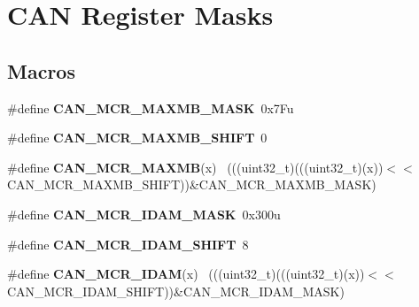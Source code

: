 \hypertarget{group___c_a_n___register___masks}{}\section{C\+A\+N Register Masks}
\label{group___c_a_n___register___masks}
\subsection*{Macros}
\begin{DoxyCompactItemize}
\item 
\hypertarget{group___c_a_n___register___masks_ga86b59c74c0b9f310c3922c7c8c04dd03}{}\#define {\bfseries C\+A\+N\+\_\+\+M\+C\+R\+\_\+\+M\+A\+X\+M\+B\+\_\+\+M\+A\+S\+K}~0x7\+Fu\label{group___c_a_n___register___masks_ga86b59c74c0b9f310c3922c7c8c04dd03}

\item 
\hypertarget{group___c_a_n___register___masks_ga0807275385d5041baeca3bb7ddb4bdf5}{}\#define {\bfseries C\+A\+N\+\_\+\+M\+C\+R\+\_\+\+M\+A\+X\+M\+B\+\_\+\+S\+H\+I\+F\+T}~0\label{group___c_a_n___register___masks_ga0807275385d5041baeca3bb7ddb4bdf5}

\item 
\hypertarget{group___c_a_n___register___masks_ga7d840ec6bea7287110c94cda3613bb7d}{}\#define {\bfseries C\+A\+N\+\_\+\+M\+C\+R\+\_\+\+M\+A\+X\+M\+B}(x)                                              ~(((uint32\+\_\+t)(((uint32\+\_\+t)(x))$<$$<$C\+A\+N\+\_\+\+M\+C\+R\+\_\+\+M\+A\+X\+M\+B\+\_\+\+S\+H\+I\+F\+T))\&C\+A\+N\+\_\+\+M\+C\+R\+\_\+\+M\+A\+X\+M\+B\+\_\+\+M\+A\+S\+K)\label{group___c_a_n___register___masks_ga7d840ec6bea7287110c94cda3613bb7d}

\item 
\hypertarget{group___c_a_n___register___masks_ga758ccb033a3d823109f8bf4e23b46827}{}\#define {\bfseries C\+A\+N\+\_\+\+M\+C\+R\+\_\+\+I\+D\+A\+M\+\_\+\+M\+A\+S\+K}~0x300u\label{group___c_a_n___register___masks_ga758ccb033a3d823109f8bf4e23b46827}

\item 
\hypertarget{group___c_a_n___register___masks_gae76a75d680b0c33f41429f14132ee78f}{}\#define {\bfseries C\+A\+N\+\_\+\+M\+C\+R\+\_\+\+I\+D\+A\+M\+\_\+\+S\+H\+I\+F\+T}~8\label{group___c_a_n___register___masks_gae76a75d680b0c33f41429f14132ee78f}

\item 
\hypertarget{group___c_a_n___register___masks_ga18ead0b4277d8ce2b1bd4fe80769c46f}{}\#define {\bfseries C\+A\+N\+\_\+\+M\+C\+R\+\_\+\+I\+D\+A\+M}(x)                                                ~(((uint32\+\_\+t)(((uint32\+\_\+t)(x))$<$$<$C\+A\+N\+\_\+\+M\+C\+R\+\_\+\+I\+D\+A\+M\+\_\+\+S\+H\+I\+F\+T))\&C\+A\+N\+\_\+\+M\+C\+R\+\_\+\+I\+D\+A\+M\+\_\+\+M\+A\+S\+K)\label{group___c_a_n___register___masks_ga18ead0b4277d8ce2b1bd4fe80769c46f}


\end{DoxyCompactItemize}
